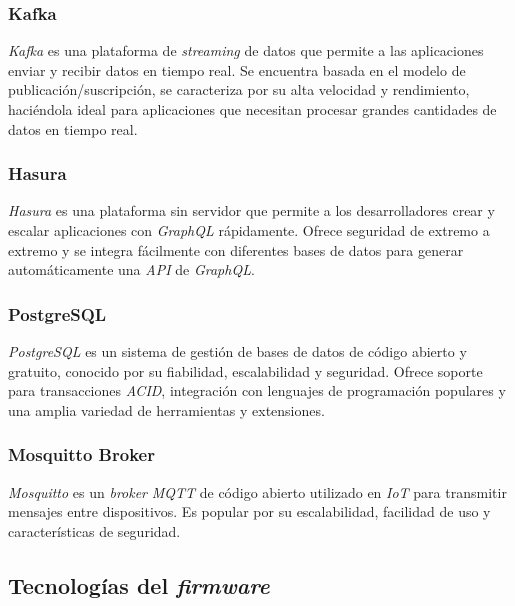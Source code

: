 \subsubsection{Kafka}

\textit{Kafka} \citep{kafka} es una plataforma de \textit{streaming} de datos que permite a las aplicaciones enviar y recibir datos en tiempo real. Se encuentra basada en el modelo de publicación/suscripción, se caracteriza por su alta velocidad y rendimiento, haciéndola ideal para aplicaciones que necesitan procesar grandes cantidades de datos en tiempo real.


\newpage
\subsubsection{Hasura}

\textit{Hasura} \citep{hasura} es una plataforma sin servidor que permite a los desarrolladores crear y escalar aplicaciones con \textit{GraphQL} rápidamente. Ofrece seguridad de extremo a extremo y se integra fácilmente con diferentes bases de datos para generar automáticamente una \textit{API} de \textit{GraphQL}.

\subsubsection{PostgreSQL}

\textit{PostgreSQL} \citep{postgresql} es un sistema de gestión de bases de datos de código abierto y gratuito, conocido por su fiabilidad, escalabilidad y seguridad. Ofrece soporte para transacciones \textit{ACID}, integración con lenguajes de programación populares y una amplia variedad de herramientas y extensiones.


\subsubsection{Mosquitto Broker}

\textit{Mosquitto} \citep{mosquitto} es un \textit{broker} \textit{MQTT} de código abierto utilizado en \textit{IoT} para transmitir mensajes entre dispositivos. Es popular por su escalabilidad, facilidad de uso y características de seguridad.


\subsection{Tecnologías del \textit{firmware}}


